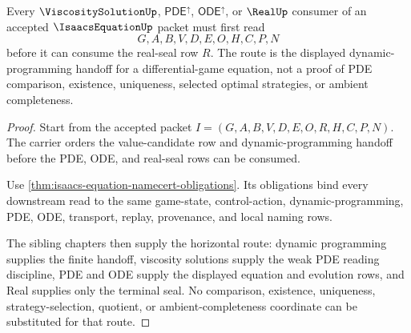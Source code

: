 \begin{theorem}
\label{thm:isaacs-equation-dynamic-programming-route}
Every $\ViscositySolutionUp$, $\mathsf{PDE}^{\uparrow}$, $\mathsf{ODE}^{\uparrow}$, or $\RealUp$ consumer of an accepted $\IsaacsEquationUp$ packet must first read
$$
G,A,B,V,D,E,O,H,C,P,N
$$
before it can consume the real-seal row $R$. The route is the displayed dynamic-programming handoff for a differential-game equation, not a proof of PDE comparison, existence, uniqueness, selected optimal strategies, or ambient completeness.
\end{theorem}
\begin{proof}
Start from the accepted packet $I=(G,A,B,V,D,E,O,R,H,C,P,N)$. The carrier orders the value-candidate row and dynamic-programming handoff before the PDE, ODE, and real-seal rows can be consumed.

Use \autoref{thm:isaacs-equation-namecert-obligations}. Its obligations bind every downstream read to the same game-state, control-action, dynamic-programming, PDE, ODE, transport, replay, provenance, and local naming rows.

The sibling chapters then supply the horizontal route: dynamic programming supplies the finite handoff, viscosity solutions supply the weak PDE reading discipline, PDE and ODE supply the displayed equation and evolution rows, and Real supplies only the terminal seal. No comparison, existence, uniqueness, strategy-selection, quotient, or ambient-completeness coordinate can be substituted for that route.
\end{proof}



